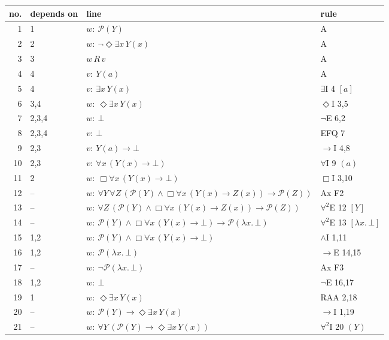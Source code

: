 {\footnotesize\setlength{\tabcolsep}{4pt}
\begin{longtable}{@{}r>{\raggedright}p{}p{}>{\raggedright\arraybackslash}p{}@{}}\toprule
no. & depends on & line & rule\\\midrule\endhead
1 & 1 & $w:\ \mathcal{P}(Y)$ & A\\
2 & 2 & $w:\ \neg \Diamond \exists x\, Y(x)$ & A\\
3 & 3 & $w\,R\,v$ & A\\
4 & 4 & $v:\ Y(a)$ & A\\
5 & 4 & $v:\ \exists x\, Y(x)$ & $\exists$I 4 $[a]$\\
6 & 3,4 & $w:\ \Diamond \exists x\, Y(x)$ & $\Diamond$I 3,5\\
7 & 2,3,4 & $w:\ \bot$ & $\neg$E 6,2\\
8 & 2,3,4 & $v:\ \bot$ & EFQ 7\\
9 & 2,3 & $v:\ Y(a) \to \bot$ & $\to$I 4,8\\
10 & 2,3 & $v:\ \forall x\, (Y(x) \to \bot)$ & $\forall$I 9 $(a)$\\
11 & 2 & $w:\ \Box \forall x\, (Y(x) \to \bot)$ & $\Box$I 3,10\\
12 & -- & $w:\ \forall Y\, \forall Z\, (\mathcal{P}(Y) \wedge \Box \forall x\, (Y(x) \to Z(x)) \to \mathcal{P}(Z))$ & Ax F2\\
13 & -- & $w:\ \forall Z\, (\mathcal{P}(Y) \wedge \Box \forall x\, (Y(x) \to Z(x)) \to \mathcal{P}(Z))$ & $\forall^2$E 12 $[Y]$\\
14 & -- & $w:\ \mathcal{P}(Y) \wedge \Box \forall x\, (Y(x) \to \bot) \to \mathcal{P}(\lambda x.\,\bot)$ & $\forall^2$E 13 $[\lambda x.\,\bot]$\\
15 & 1,2 & $w:\ \mathcal{P}(Y) \wedge \Box \forall x\, (Y(x) \to \bot)$ & $\wedge$I 1,11\\
16 & 1,2 & $w:\ \mathcal{P}(\lambda x.\,\bot)$ & $\to$E 14,15\\
17 & -- & $w:\ \neg \mathcal{P}(\lambda x.\,\bot)$ & Ax F3\\
18 & 1,2 & $w:\ \bot$ & $\neg$E 16,17\\
19 & 1 & $w:\ \Diamond \exists x\, Y(x)$ & RAA 2,18\\
20 & -- & $w:\ \mathcal{P}(Y) \to \Diamond \exists x\, Y(x)$ & $\to$I 1,19\\
21 & -- & $w:\ \forall Y\, (\mathcal{P}(Y) \to \Diamond \exists x\, Y(x))$ & $\forall^2$I 20 $(Y)$\\
\bottomrule\end{longtable}}
